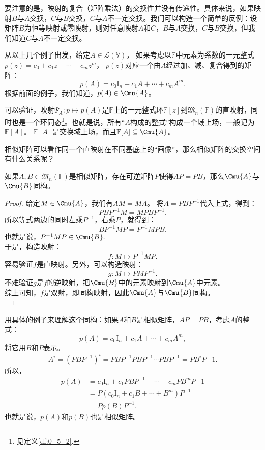 \documentclass[12pt,UTF8,fontset=none]{ctexbook}
\begin{document}
要注意的是，映射的复合（矩阵乘法）的交换性并没有传递性。具体来说，如果映射$B$与$A$交换，$C$与$B$交换，$C$与$A$不一定交换。我们可以构造一个简单的反例：设矩阵$B$为恒等映射或零映射，则对任意映射$A$和$C$，$B$与$A$交换，$C$与$B$交换，但我们知道$C$与$A$不一定交换。

从以上几个例子出发，给定$A \in \mathcal{L}(\mathbb{V})$，
如果考虑以$\mathbb{F}$中元素为系数的一元整式$p(z) = c_0 + c_1 z + \cdots + c_m z^m$，
$p(z)$对应一个由$A$经过加、减、复合得到的矩阵：
$$ p(A) = c_0 \mathrm{I}_n + c_1 A + \cdots + c_m A^m.$$
根据前面的例子，我们知道，$p(A) \in \Cmu{A}$。

可以验证，映射$\Psi_A: p \mapsto p(A)$是$\mathbb{F}$上的一元整式环$\mathbb{F}[z]$到$\mathfrak{M}_n(\mathbb{F})$的直映射，同时也是一个环同态\footnote{见定义\ref{df:0_5_2}.}。也就是说，所有“$A$构成的整式”构成一个域上场，一般记为$\mathbb{F}[A]$。
$\mathbb{F}[A]$是交换域上场，而且$\mathbb{F}[A] \subseteq \Cmu{A}$。

相似矩阵可以看作同一个直映射在不同基底上的“画像”，那么相似矩阵的交换空间有什么关系呢？
\begin{pp}\label{pp:5_3}
    如果$A, B \in \mathfrak{M}_n(\mathbb{F})$是相似矩阵，存在可逆矩阵$P$使得$AP = PB$，那么$\Cmu{A}$与$\Cmu{B}$同构。
\end{pp}
\begin{proof} %
    给定$M \in \Cmu{A}$，我们有$ AM = MA$。
    将$A = PBP^{-1}$代入上式，得到：
    $$ PBP^{-1}M = MPBP^{-1}.$$
    所以等式两边的同时左乘$P^{-1}$，右乘$P$，就得到：
    $$  BP^{-1}MP = P^{-1}MPB. $$
    也就是说，$ P^{-1}MP \in \Cmu{B}.$\\
    于是，构造映射：
    $$ f : M \mapsto P^{-1}MP.$$
    容易验证$f$是直映射。另外，可以构造映射：
    $$ g : M \mapsto PMP^{-1}.$$
    不难验证$g$是$f$的逆映射，把$\Cmu{B}$中的元素映射到$\Cmu{A}$中元素。\\
    综上可知，$f$是双射，即同构映射，因此$\Cmu{A}$与$\Cmu{B}$同构。\\
\end{proof}

用具体的例子来理解这个同构：如果$A$和$B$是相似矩阵，$AP = PB$，考虑$A$的整式：
$$p(A) = c_0\mathrm{I}_n + c_1 A + \cdots + c_m A^m,$$
将它用$B$和$P$表示。
$$A^i = \left(PBP^{-1}\right)^i = PBP^{-1} PBP^{-1} \cdots PBP^{-1} = PB^iP{-1}.$$
所以，
\begin{align*}
    p(A) &= c_0\mathrm{I}_n + c_1 PBP^{-1} + \cdots + c_m PB^mP{-1}  \\
    &= P\left(c_0\mathrm{I}_n + c_1 B + \cdots + B^m\right)P^{-1}  \\
    &= Pp(B)P^{-1}.  
\end{align*}
也就是说，$p(A)$和$p(B)$也是相似矩阵。
\end{document}
